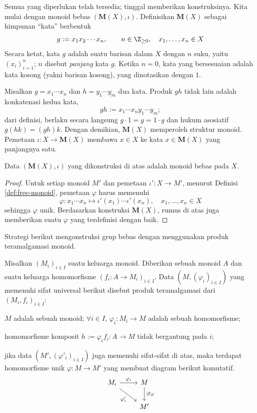 Semua yang diperlukan telah tersedia; tinggal memberikan konstruksinya. Kita mulai dengan monoid bebas $(\mathbf{M}(X), \iota)$. Definisikan $\mathbf{M}(X)$ sebagai himpunan ``kata'' berbentuk
\[ g := x_1 x_2  \cdots x_n, \qquad n \in \Z_{\geq 0}, \quad x_1, \ldots, x_n \in X \]
Secara ketat, kata $g$ adalah suatu barisan dalam $X$ dengan $n$ suku, yaitu $(x_i)_{i=1}^n$; $n$ disebut \emph{panjang} kata $g$. Ketika $n=0$, kata yang bersesuaian adalah kata kosong (yakni barisan kosong), yang dinotasikan dengan $1$.

Misalkan $g = x_1 \cdots x_n$ dan $h = y_1 \cdots y_m$ dua kata. Produk $gh$ tidak lain adalah konkatenasi kedua kata,
\[ gh := x_1 \cdots x_n y_1 \cdots y_m; \]
dari definisi, berlaku secara langsung $g \cdot 1 = g = 1 \cdot g$ dan hukum asosiatif $g(hk) = (gh)k$. Dengan demikian, $\mathbf{M}(X)$ memperoleh struktur monoid. Pemetaan $\iota: X \to \mathbf{M}(X)$ membawa $x \in X$ ke kata $x \in \mathbf{M}(X)$ yang panjangnya satu.

\begin{lemma}
	Data $(\mathbf{M}(X), \iota)$ yang dikonstruksi di atas adalah monoid bebas pada $X$.
\end{lemma}
\begin{proof}
	Untuk setiap monoid $M'$ dan pemetaan $\iota': X \to M'$, menurut Definisi \ref{def:free-monoid}, pemetaan $\varphi$ harus memenuhi
	\[ \varphi: x_1 \cdots x_n \longmapsto \iota'(x_1) \cdots \iota'(x_n), \quad x_1, \ldots, x_n \in X \]
	sehingga $\varphi$ unik. Berdasarkan konstruksi $\mathbf{M}(X)$, rumus di atas juga memberikan suatu $\varphi$ yang terdefinisi dengan baik.
\end{proof}

Strategi berikut mengonstruksi grup bebas dengan menggunakan produk teramalgamasi monoid.
\begin{definition}\label{def:amalgamated-product}
	Misalkan $(M_i)_{i \in I}$ suatu keluarga monoid. Diberikan sebuah monoid $A$ dan suatu keluarga homomorfisme $(f_i: A \to M_i )_{i \in I}$. Data $(M, (\varphi_i)_{i \in I})$ yang memenuhi sifat universal berikut disebut produk teramalgamasi dari $(M_i, f_i)_{i \in I}$:
	\begin{compactitem}
		\item $M$ adalah sebuah monoid; $\forall i \in I$, $\varphi_i: M_i \to M$ adalah sebuah homomorfisme;
		\item homomorfisme komposit $h := \varphi_i f_i: A \to M$ tidak bergantung pada $i$;
		\item jika data $(M', (\varphi'_i)_{i \in I})$ juga memenuhi sifat-sifat di atas, maka terdapat homomorfisme unik $\varphi: M \to M'$ yang membuat diagram berikut komutatif.
		\[ \begin{tikzcd}
			M_i \arrow[r, "{\varphi_i}"] \arrow[rd, "{\varphi'_i}"'] & M \arrow[d, "{\exists! \varphi}"] \\
			& M'
		\end{tikzcd} \]
	\end{compactitem}
\end{definition}

